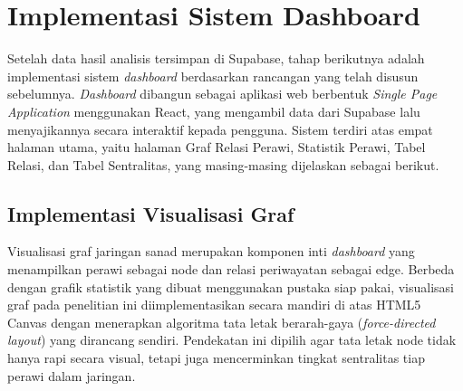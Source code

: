 \section{Implementasi Sistem Dashboard}
Setelah data hasil analisis tersimpan di Supabase, tahap berikutnya adalah implementasi sistem \textit{dashboard} berdasarkan rancangan yang telah disusun sebelumnya. \textit{Dashboard} dibangun sebagai aplikasi web berbentuk \textit{Single Page Application} menggunakan React, yang mengambil data dari Supabase lalu menyajikannya secara interaktif kepada pengguna. Sistem terdiri atas empat halaman utama, yaitu halaman Graf Relasi Perawi, Statistik Perawi, Tabel Relasi, dan Tabel Sentralitas, yang masing-masing dijelaskan sebagai berikut.

\subsection{Implementasi Visualisasi Graf}
\label{subsec:implementasi-visualisasi-graf}
Visualisasi graf jaringan sanad merupakan komponen inti \textit{dashboard} yang menampilkan perawi sebagai node dan relasi periwayatan sebagai edge. Berbeda dengan grafik statistik yang dibuat menggunakan pustaka siap pakai, visualisasi graf pada penelitian ini diimplementasikan secara mandiri di atas HTML5 Canvas dengan menerapkan algoritma tata letak berarah-gaya (\textit{force-directed layout}) yang dirancang sendiri. Pendekatan ini dipilih agar tata letak node tidak hanya rapi secara visual, tetapi juga mencerminkan tingkat sentralitas tiap perawi dalam jaringan.

